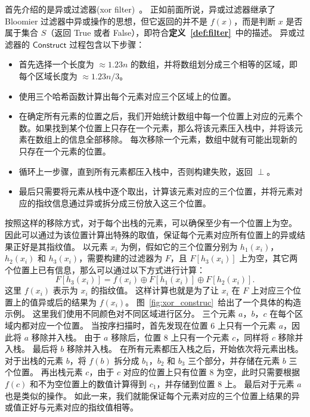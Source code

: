 首先介绍的是异或过滤器(xor filter)~\cite{graf2020xor}。
正如前面所说，异或过滤器继承了 Bloomier 过滤器中异或操作的思想，但它返回的并不是 $f(x)$，而是判断 $x$ 是否属于集合 $S$（返回 True 或者 False），即符合\textbf{定义~\ref{def:filter}}~中的描述。
异或过滤器的 $\mathsf{Construct}$ 过程包含以下步骤：
\begin{itemize}
  \item 首先选择一个长度为 $\approx 1.23n$ 的数组，并将数组划分成三个相等的区域，即每个区域长度为 $\approx 1.23n/3$。
  \item 使用三个哈希函数计算出每个元素对应三个区域上的位置。
  \item 在确定所有元素的位置之后，我们开始统计数组中每一个位置上对应的元素个数。如果找到某个位置上只存在一个元素，那么将该元素压入栈中，并将该元素在数组上的信息全部移除。
每次移除一个元素，数组中就有可能出现新的只存在一个元素的位置。
  \item 循环上一步骤，直到所有元素都压入栈中，否则构建失败，返回 $\perp$。
  \item 最后只需要将元素从栈中逐个取出，计算该元素对应的三个位置，并将元素对应的指纹信息通过异或拆分成三份放入这三个位置。
\end{itemize}
按照这样的移除方式，对于每个出栈的元素，可以确保至少有一个位置上为空。
因此可以通过为该位置计算出特殊的取值，保证每个元素对应所有位置上的异或结果正好是其指纹值。
以元素 $x_i$ 为例，假如它的三个位置分别为 $h_1(x_i)$，$h_2(x_i)$ 和 $h_3(x_i)$，需要构建的过滤器为 $F$，且 $F[h_3(x_i)]$ 上为空，其它两个位置上已有信息，那么可以通过以下方式进行计算：
\begin{equation}
  F[h_3(x_i)] = f(x_i) \oplus F[h_1(x_i)] \oplus F[h_2(x_i)].
\end{equation}
这里 $f(x_i)$ 表示为 $x_i$ 的指纹值。
这样计算也就是为了让 $x_i$ 在 $F$ 上对应三个位置上的值异或后的结果为 $f(x_i)$。
图~\ref{fig:xor_construc}~给出了一个具体的构造示例。
这里我们使用不同颜色对不同区域进行区分。
三个元素 $a$，$b$，$c$ 在每个区域内都对应一个位置。
当按序扫描时，首先发现在位置 $6$ 上只有一个元素 $a$，因此将 $a$ 移除并入栈。
由于 $a$ 移除后，位置 $8$ 上只有一个元素 $c$，同样将 $c$ 移除并入栈。
最后将 $b$ 移除并入栈。
在所有元素都压入栈之后，开始依次将元素出栈。
对于出栈的元素 $b$，将 $f(b)$ 拆分成 $b_1$，$b_2$ 和 $b_3$ 三个部分，并存储在元素 $b$ 三个位置。
再出栈元素 $c$，由于 $c$ 对应的位置上只有位置 $8$ 为空，此时只需要根据 $f(c)$ 和不为空位置上的数值计算得到 $c_1$，并存储到位置 $8$ 上。
最后对于元素 $a$ 也是类似的操作。
如此一来，我们就能保证每个元素对应的三个位置上结果的异或值正好与元素对应的指纹值相等。

